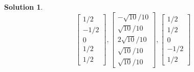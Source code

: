 \documentclass[11pt]{scrartcl}
\theoremstyle{dotlessP}
\newtheorem{sol}{Solution}[section]
\theoremstyle{dotlessN}
\begin{document}
\begin{sol}
\[{\begin{bmatrix}
			1/2 \\
			-1/2 \\
			0 \\
				1/2 \\
		1/2 
	\end{bmatrix},	\begin{bmatrix}
		-\sqrt{10}/10 \\
		\sqrt{10}/10 \\
2\sqrt{10}/10 \\
\sqrt{10}/10\\ 
\sqrt{10}/10
\end{bmatrix},
\begin{bmatrix}
	1/2 \\
	1/2 \\
	0 \\
	-1/2 \\
	1/2
\end{bmatrix}
}
\] 
\end{sol}
\end{document}
